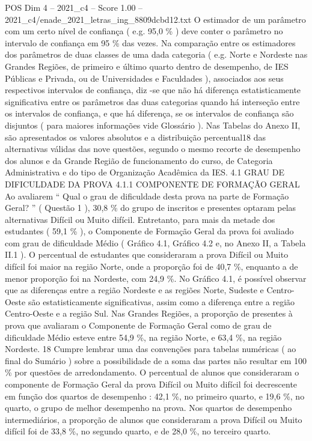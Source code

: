 \begin{textsample}{POS Dim 4 – 2021\_c4 – Score 1.00 – 2021\_c4/enade\_2021\_letras\_ing\_8809dcbd12.txt}
O estimador de um parâmetro com um certo nível de confiança ( e.g. 95,0 \% ) deve conter o parâmetro no intervalo de confiança em 95 \% das vezes.
Na comparação entre os estimadores dos parâmetros de duas classes de uma dada categoria ( e.g.
Norte e Nordeste nas Grandes Regiões, de primeiro e último quarto dentro de desempenho, de IES Públicas e Privada, ou de Universidades e Faculdades ), associados aos seus respectivos intervalos de confiança, diz -se que não há diferença estatisticamente significativa entre os parâmetros das duas categorias quando há interseção entre os intervalos de confiança, e que há diferença, se os intervalos de confiança são disjuntos ( para maiores informações vide Glossário ).
Nas Tabelas do Anexo II, são apresentados os valores absolutos e a distribuição percentual18 das alternativas válidas das nove questões, segundo o mesmo recorte de desempenho dos alunos e da Grande Região de funcionamento do curso, de Categoria Administrativa e do tipo de Organização Acadêmica da IES. 4.1 GRAU DE DIFICULDADE DA PROVA 4.1.1 COMPONENTE DE FORMAÇÃO GERAL Ao avaliarem “ Qual o grau de dificuldade desta prova na parte de Formação Geral? ” ( Questão 1 ), 30,8 \% do grupo de inscritos e presentes optaram pelas alternativas Difícil ou Muito difícil.
Entretanto, para mais da metade dos estudantes ( 59,1 \% ), o Componente de Formação Geral da prova foi avaliado com grau de dificuldade Médio ( Gráfico 4.1, Gráfico 4.2 e, no Anexo II, a Tabela II.1 ).
O percentual de estudantes que consideraram a prova Difícil ou Muito difícil foi maior na região Norte, onde a proporção foi de 40,7 \%, enquanto a de menor proporção foi na Nordeste, com 24,9 \%.
No Gráfico 4.1, é possível observar que as diferenças entre a região Nordeste e as regiões Norte, Sudeste e Centro-Oeste são estatisticamente significativas, assim como a diferença entre a região Centro-Oeste e a região Sul.
Nas Grandes Regiões, a proporção de presentes à prova que avaliaram o Componente de Formação Geral como de grau de dificuldade Médio esteve entre 54,9 \%, na região Norte, e 63,4 \%, na região Nordeste. 18 Cumpre lembrar uma das convenções para tabelas numéricas ( ao final do Sumário ) sobre a possibilidade de a soma das partes não resultar em 100 \% por questões de arredondamento.
O percentual de alunos que consideraram o componente de Formação Geral da prova Difícil ou Muito difícil foi decrescente em função dos quartos de desempenho : 42,1 \%, no primeiro quarto, e 19,6 \%, no quarto, o grupo de melhor desempenho na prova.
Nos quartos de desempenho intermediários, a proporção de alunos que consideraram a prova Difícil ou Muito difícil foi de 33,8 \%, no segundo quarto, e de 28,0 \%, no terceiro quarto.

\end{textsample}
